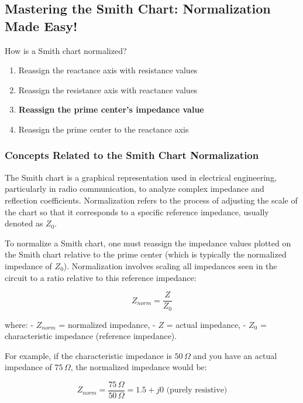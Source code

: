 \subsection{Mastering the Smith Chart: Normalization Made Easy!}

\begin{tcolorbox}[colback=gray!10, colframe=black, title=E9G08] 
How is a Smith chart normalized?

\begin{enumerate}[label=\Alph*.]
    \item Reassign the reactance axis with resistance values
    \item Reassign the resistance axis with reactance values
    \item \textbf{Reassign the prime center’s impedance value}
    \item Reassign the prime center to the reactance axis
\end{enumerate} \end{tcolorbox}

\subsubsection{Concepts Related to the Smith Chart Normalization}

The Smith chart is a graphical representation used in electrical engineering, particularly in radio communication, to analyze complex impedance and reflection coefficients. Normalization refers to the process of adjusting the scale of the chart so that it corresponds to a specific reference impedance, usually denoted as \( Z_0 \).

To normalize a Smith chart, one must reassign the impedance values plotted on the Smith chart relative to the prime center (which is typically the normalized impedance of \( Z_0 \)). Normalization involves scaling all impedances seen in the circuit to a ratio relative to this reference impedance:

\[
Z_{norm} = \frac{Z}{Z_0}
\]

where:
- \( Z_{norm} \) = normalized impedance,
- \( Z \) = actual impedance,
- \( Z_0 \) = characteristic impedance (reference impedance).

For example, if the characteristic impedance is \( 50 \, \Omega \) and you have an actual impedance of \( 75 \, \Omega \), the normalized impedance would be:

\[
Z_{norm} = \frac{75 \, \Omega}{50 \, \Omega} = 1.5 + j0 \text{ (purely resistive)}
\]

